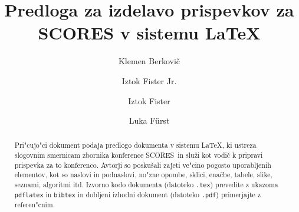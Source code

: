 \documentclass[sigconf]{acmart}
\newcommand{\scores}{\textsc{SCORES}}
\begin{document}
\title{Predloga za izdelavo prispevkov za SCORES v sistemu \LaTeX}


\author{Klemen Berkovič}

\author{Iztok Fister Jr.}

\author{Iztok Fister}

\author{Luka F\"{u}rst}

\begin{abstract}
    Pri"cujo"ci dokument podaja predlogo dokumenta v sistemu \LaTeX, ki
    ustreza slogovnim smernicam zbornika konference \scores\ in služi kot
    vodič k pripravi prispevka za to konferenco.  Avtorji so poskušali zajeti
    ve"cino pogosto uporabljenih elementov, kot so naslovi in podnaslovi,
    no"zne opombe, sklici, enačbe, tabele, slike, seznami, algoritmi itd.
    Izvorno kodo dokumenta (datoteko \texttt{.tex}) prevedite z ukazoma
    \texttt{pdflatex} in \texttt{bibtex} in dobljeni izhodni dokument
    (datoteko \texttt{.pdf}) primerjajte z referen"cnim.
\end{abstract}
\end{document}
